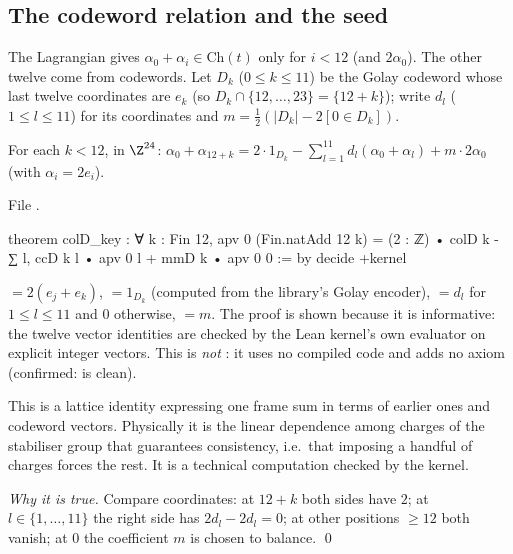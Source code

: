 \subsection{The codeword relation and the seed}
The Lagrangian gives $\alpha_0+\alpha_i\in\mathrm{Ch}(t)$ only for $i<12$ (and $2\alpha_0$). The other twelve come
from codewords. Let $D_k$ ($0\le k\le11$) be the Golay codeword whose last twelve coordinates are $e_k$
(so $D_k\cap\{12,\dots,23\}=\{12+k\}$); write $d_l$ ($1\le l\le 11$) for its coordinates and
$m=\tfrac12(|D_k|-2[0\in D_k])$.
\begin{lemma}\label{ch13:lem:colD}
For each $k<12$, in $\Z^{24}$:
$\alpha_0+\alpha_{12+k}=2\cdot1_{D_k}-\sum_{l=1}^{11}d_l(\alpha_0+\alpha_l)+m\cdot2\alpha_0$ (with $\alpha_i=2e_i$).
\end{lemma}
\noindent File .
\begin{leancode}
theorem colD_key : ∀ k : Fin 12, apv 0 (Fin.natAdd 12 k) =
    (2 : ℤ) • colD k - ∑ l, ccD k l • apv 0 l + mmD k • apv 0 0 := by decide +kernel
\end{leancode}
\begin{dictionary}
 $=2(e_j+e_k)$,  $=1_{D_k}$ (computed from the library's Golay encoder),
 $=d_l$ for $1\le l\le11$ and $0$ otherwise,  $=m$. The proof 
is shown because it is informative: the twelve vector identities are checked by the Lean
kernel's own evaluator on explicit integer vectors. This is \emph{not} : it uses no
compiled code and adds no axiom (confirmed:  is clean).
\end{dictionary}
\begin{physics}
This is a lattice identity expressing one frame sum in terms of earlier ones and codeword vectors. Physically it is the linear dependence among charges of the stabiliser group that guarantees consistency, i.e.\ that imposing a handful of charges forces the rest. It is a technical computation checked by the kernel.
\end{physics}
\noindent\emph{Why it is true.} Compare coordinates: at $12+k$ both sides have $2$; at $l\in\{1,\dots,11\}$ the
right side has $2d_l-2d_l=0$; at other positions $\ge12$ both vanish; at $0$ the coefficient $m$ is chosen to
balance. \qed


